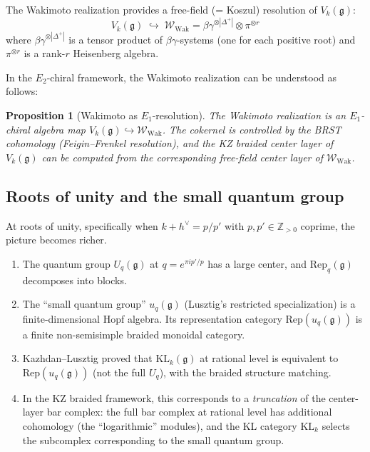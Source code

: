 \documentclass[11pt]{article}
\newtheorem{proposition}[theorem]{Proposition}
\theoremstyle{definition}
\theoremstyle{remark}
\newcommand{\Rep}{\mathrm{Rep}}
\newcommand{\Uq}{U_q}
\newcommand{\frakg}{\mathfrak{g}}
\newcommand{\KL}{\mathrm{KL}}
\newcommand{\hv}{h^\vee}
\begin{document}
The Wakimoto realization provides a free-field (= Koszul) resolution of
$V_k(\frakg)$:
\[
 V_k(\frakg) \;\hookrightarrow\;
 \mathcal{W}_{\mathrm{Wak}} = \beta\gamma^{\otimes |\Delta^+|}
 \otimes \pi^{\otimes r}
\]
where $\beta\gamma^{\otimes |\Delta^+|}$ is a tensor product of
$\beta\gamma$-systems (one for each positive root) and $\pi^{\otimes r}$
is a rank-$r$ Heisenberg algebra.

In the $E_2$-chiral framework, the Wakimoto realization can be
understood as follows:

\begin{proposition}[Wakimoto as $E_1$-resolution]
\label{prop:wakimoto-e1}
The Wakimoto realization is an $E_1$-chiral algebra map
$V_k(\frakg) \hookrightarrow \mathcal{W}_{\mathrm{Wak}}$.
The cokernel is controlled by the BRST cohomology
	(Feigin--Frenkel resolution), and the KZ braided center layer of
	$V_k(\frakg)$ can be computed from the corresponding free-field
	center layer of $\mathcal{W}_{\mathrm{Wak}}$.
\end{proposition}

\subsection{Roots of unity and the small quantum group}
\label{subsec:roots-of-unity}

At roots of unity, specifically when $k + \hv = p/p'$ with
$p, p' \in \mathbb{Z}_{>0}$ coprime, the picture becomes richer.

\begin{enumerate}[label=(\roman*)]
 \item The quantum group $\Uq(\frakg)$ at $q = e^{\pi i p'/p}$ has a
 large center, and $\Rep_q(\frakg)$ decomposes into blocks.
 \item The ``small quantum group'' $u_q(\frakg)$ (Lusztig's restricted
 specialization) is a finite-dimensional Hopf algebra. Its
 representation category $\Rep(u_q(\frakg))$ is a finite
 non-semisimple braided monoidal category.
 \item Kazhdan--Lusztig proved that $\KL_k(\frakg)$ at rational level
 is equivalent to $\Rep(u_q(\frakg))$ (not the full $\Uq$), with
 the braided structure matching.
 \item In the KZ braided framework, this corresponds to a
 \emph{truncation} of the center-layer bar complex: the full bar complex
 at rational level has additional cohomology (the ``logarithmic''
 modules), and the KL category $\KL_k$ selects the subcomplex
 corresponding to the small quantum group.
\end{enumerate}
\end{document}
